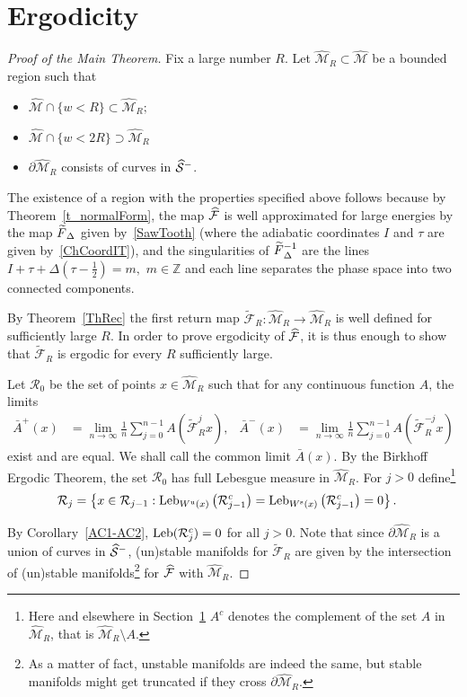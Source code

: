 \documentclass[10pt]{amsart}
\theoremstyle{definition}\newtheorem{defi}[theo]{Definition}\newtheorem{rema}[theo]{Remark}\newtheorem{exam}[theo]{Example}\newtheorem{exem}[theo]{Example}\newtheorem{nota}[theo]{Notation}
\newcommand{\unstable}{\text{u}}
\newcommand{\stable}{\text{s}}
\newcommand{\bZ}{\mathbb{Z}}
\newcommand{\cR}{\mathcal{R}}
\newcommand{\cm}{\mathcal{F}}
\newcommand{\csp}{\mathcal{M}}
\newcommand{\cmp}{\hat\cm}
\newcommand{\cspi}{\widehat{\csp}}
\newcommand{\brA}{\bar{A}}
\newcommand{\tcF}{\widetilde{\mathcal{F}}}
\newcommand{\Ws}{W^{\stable}}
\newcommand{\Wu}{W^{\unstable}}
\newcommand{\singPrivate}{\mathcal{S}}
\newcommand{\singp}[1]{\hat{\singPrivate}^{#1}}
\newcommand{\Leb}{\textup{Leb}}
\newcommand{\nfr}{\tilde F}
\let\oldtilde\tilde
\renewcommand*{\tilde}[1]{\mathchoice{\widetilde{#1}}{\widetilde{#1}}{\oldtilde{#1}}{\oldtilde{#1}}}
\let\oldhat\hat
\renewcommand*{\hat}[1]{\mathchoice{\widehat{#1}}{\widehat{#1}}{\oldhat{#1}}{\oldhat{#1}}}
\begin{document}
\section{Ergodicity}\label{ScErg}
\begin{proof}[Proof of the Main Theorem]
Fix a large number $R$. Let $\cspi_R\subset \cspi$ be a bounded region such that
\begin{itemize}
\item $\cspi\cap \{w<R\}\subset \cspi_R;$
\item $\cspi\cap \{w<2R\}\supset \cspi_R$
\item $\partial \cspi_R$ consists of curves in $\singp-$.
\end{itemize}

The existence of a region with the properties specified above follows because by Theorem~\ref{t_normalForm}, the map $\cmp$ is well approximated for large energies by the map $\nfr_\Delta$ given by~\eqref{SawTooth} (where the adiabatic coordinates $I$ and $\tau$ are given by~\eqref{ChCoordIT}), and the singularities of $\nfr_\Delta^{-1}$ are the lines $I+\tau+\Delta(\tau-\frac{1}{2})=m,$ $m\in \bZ$ and each line separates the phase space into two connected components.

By Theorem~\ref{ThRec} the first return map $\tcF_R:\cspi_R\to\cspi_R$ is well defined for sufficiently large $R$. In order to prove ergodicity of $\cmp$, it is thus enough to show that $\tcF_R$ is ergodic for every $R$ sufficiently large.

Let $\cR_0$ be the set of points $x\in \cspi_R$ such that for any continuous function $A$, the limits
\begin{align*}
\brA^+(x)&=\lim_{n\to\infty} \frac1n\sum_{j=0}^{n-1} A\left(\tcF_R^j x\right),&
\brA^-(x)&=\lim_{n\to\infty} \frac1n\sum_{j=0}^{n-1} A\left(\tcF_R^{-j} x\right)
\end{align*}
exist and are equal. We shall call the common limit $\brA(x)$. By the Birkhoff Ergodic Theorem, the set $\cR_0$ has full Lebesgue measure in $\cspi_R$. For $j > 0$ define\footnote{ Here and elsewhere in Section~\ref{ScErg} $A^c$ denotes the complement of the set $A$ in $\cspi_R$, that is $\cspi_{R}\setminus A$.}
\begin{align*}
\cR_j&=\left\{x\in \cR_{j-1}: \Leb_{\Wu(x)}\left(\cR_{j-1}^c\right) = \Leb_{\Ws(x)}\left(\cR_{j-1}^c\right)=0\right\}.
\end{align*}

By Corollary~\ref{AC1-AC2}, $\Leb(\cR_j^c)=0$ for all $j > 0$. Note that since $\partial\cspi_R$ is a union of curves in $\singp-$, (un)stable manifolds for $\tcF_{R}$ are given by the intersection of (un)stable manifolds\footnote{ As a matter of fact, unstable manifolds are indeed the same, but stable manifolds might get truncated if they cross $\partial\cspi_{R}$.} for $\cmp$ with $\cspi_{R}$.


\end{proof}
\end{document}
